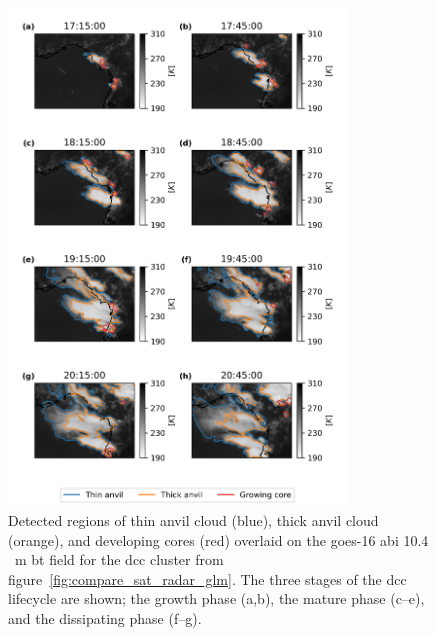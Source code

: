\begin{figure}[tp]
    \centering\includegraphics[width=0.8\textwidth]{figures/chapter1_18.png}
    \caption[
    Detected regions of thin anvil cloud, thick anvil cloud , and developing cores through the growing, mature and dissipating phases of the \acrshort{dcc} lifecycle
    ]{
    Detected regions of thin anvil cloud (blue), thick anvil cloud (orange), and developing cores (red) overlaid on the \acrshort{goes}-16 \acrshort{abi} 10.4\,\unit{\mu m} \acrshort{bt} field for the \acrshort{dcc} cluster from figure~\ref{fig:compare_sat_radar_glm}. The three stages of the \acrshort{dcc} lifecycle are shown; the growth phase (a,b), the mature phase (c--e), and the dissipating phase (f--g).
    }
    \label{fig:detected_anvils}
\end{figure}


